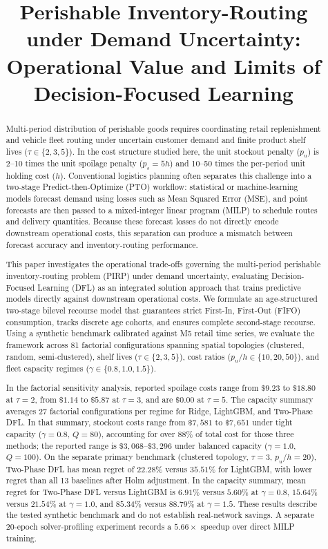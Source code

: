 \documentclass[11pt,a4paper]{article}
\title{Perishable Inventory-Routing under Demand Uncertainty: Operational Value and Limits of Decision-Focused Learning}
\author{}
\date{}
\theoremstyle{definition}
\theoremstyle{remark}
\begin{document}
\maketitle

\begin{abstract}
Multi-period distribution of perishable goods requires coordinating retail replenishment and vehicle fleet routing under uncertain customer demand and finite product shelf lives ($\tau \in \{2, 3, 5\}$). In the cost structure studied here, the unit stockout penalty ($p_u$) is 2--10 times the unit spoilage penalty ($p_s = 5h$) and 10--50 times the per-period unit holding cost ($h$). Conventional logistics planning often separates this challenge into a two-stage Predict-then-Optimize (PTO) workflow: statistical or machine-learning models forecast demand using losses such as Mean Squared Error (MSE), and point forecasts are then passed to a mixed-integer linear program (MILP) to schedule routes and delivery quantities. Because these forecast losses do not directly encode downstream operational costs, this separation can produce a mismatch between forecast accuracy and inventory-routing performance.

This paper investigates the operational trade-offs governing the multi-period perishable inventory-routing problem (PIRP) under demand uncertainty, evaluating Decision-Focused Learning (DFL) as an integrated solution approach that trains predictive models directly against downstream operational costs. We formulate an age-structured two-stage bilevel recourse model that guarantees strict First-In, First-Out (FIFO) consumption, tracks discrete age cohorts, and ensures complete second-stage recourse. Using a synthetic benchmark calibrated against M5 retail time series, we evaluate the framework across 81 factorial configurations spanning spatial topologies (clustered, random, semi-clustered), shelf lives ($\tau \in \{2, 3, 5\}$), cost ratios ($p_u/h \in \{10, 20, 50\}$), and fleet capacity regimes ($\gamma \in \{0.8, 1.0, 1.5\}$).

In the factorial sensitivity analysis, reported spoilage costs range from $\$9.23$ to $\$18.80$ at $\tau=2$, from $\$1.14$ to $\$5.87$ at $\tau=3$, and are $\$0.00$ at $\tau=5$. The capacity summary averages 27 factorial configurations per regime for Ridge, LightGBM, and Two-Phase DFL. In that summary, stockout costs range from $\$7,581$ to $\$7,651$ under tight capacity ($\gamma=0.8$, $Q=80$), accounting for over $88\%$ of total cost for those three methods; the reported range is $\$3,068$--$\$3,296$ under balanced capacity ($\gamma=1.0$, $Q=100$). On the separate primary benchmark (clustered topology, $\tau=3$, $p_u/h=20$), Two-Phase DFL has mean regret of $22.28\%$ versus $35.51\%$ for LightGBM, with lower regret than all 13 baselines after Holm adjustment. In the capacity summary, mean regret for Two-Phase DFL versus LightGBM is $6.91\%$ versus $5.60\%$ at $\gamma=0.8$, $15.64\%$ versus $21.54\%$ at $\gamma=1.0$, and $85.34\%$ versus $88.79\%$ at $\gamma=1.5$. These results describe the tested synthetic benchmark and do not establish real-network savings. A separate 20-epoch solver-profiling experiment records a $5.66\times$ speedup over direct MILP training.
\end{abstract}
\end{document}
